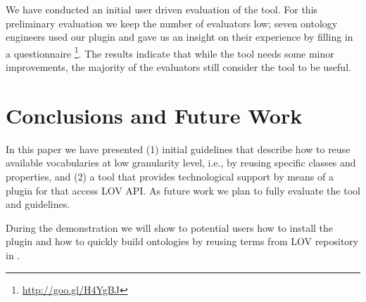 We have conducted an initial user driven evaluation of the tool. For this preliminary evaluation we keep the number of evaluators low; seven ontology engineers used our plugin and gave us an insight on their experience by filling in a questionnaire \footnote{\url{http://goo.gl/H4YgBJ}}. The results indicate that while the tool needs some minor improvements, the majority of the evaluators still consider the tool to be useful.

\vspace{-3mm}
\section{Conclusions and Future Work}\label{sec:conclusions}
In this paper we have presented (1) initial guidelines that describe how to reuse available vocabularies at low granularity level, i.e., by reusing specific classes and properties, and (2) a tool that provides technological support by means of a plugin for \protege that access LOV API. As future work we plan to fully evaluate the tool and guidelines.

During the demonstration we will show to potential users how to install the plugin and how to quickly build ontologies by reusing terms from LOV repository in \protege.

